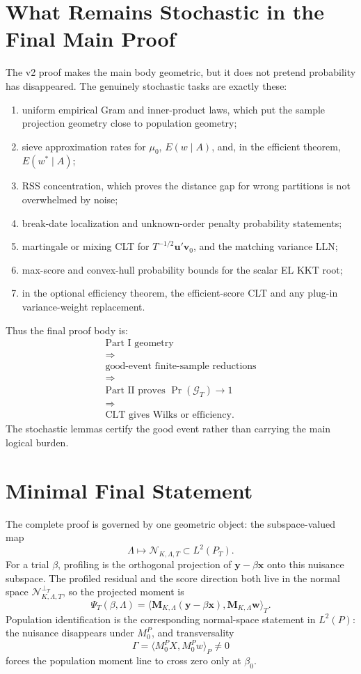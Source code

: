 \documentclass[12pt]{article}
\numberwithin{equation}{section}
\theoremstyle{definition}
\newcommand{\N}{\mathcal N}
\newcommand{\innerT}[2]{\langle #1,#2\rangle_T}
\newcommand{\innerP}[2]{\langle #1,#2\rangle_P}
\begin{document}
\section{What Remains Stochastic in the Final Main Proof}

The v2 proof makes the main body geometric, but it does not pretend probability
has disappeared. The genuinely stochastic tasks are exactly these:
\begin{enumerate}[leftmargin=2em]
\item uniform empirical Gram and inner-product laws, which put the sample
projection geometry close to population geometry;
\item sieve approximation rates for \(\mu_0\), \(E(w\mid A)\), and, in the
efficient theorem, \(E(w^*\mid A)\);
\item RSS concentration, which proves the distance gap for wrong partitions is
not overwhelmed by noise;
\item break-date localization and unknown-order penalty probability statements;
\item martingale or mixing CLT for \(T^{-1/2}\bm u'\bm v_0\), and the matching
variance LLN;
\item max-score and convex-hull probability bounds for the scalar EL KKT root;
\item in the optional efficiency theorem, the efficient-score CLT and any
plug-in variance-weight replacement.
\end{enumerate}

Thus the final proof body is:
\[
\begin{array}{c}
    \text{Part I geometry}\\
    \Longrightarrow\\
    \text{good-event finite-sample reductions}\\
    \Longrightarrow\\
    \text{Part II proves }\Pr(\mathcal G_T)\to1\\
    \Longrightarrow\\
    \text{CLT gives Wilks or efficiency.}
\end{array}
\]
The stochastic lemmas certify the good event rather than carrying the main logical burden.
\section{Minimal Final Statement}

The complete proof is governed by one geometric object: the subspace-valued map
\[
    \Lambda\longmapsto \N_{K,\Lambda,T}\subset L^2(P_T).
\]
For a trial \(\beta\), profiling is the orthogonal projection of
\(\bm y-\beta\bm x\) onto this nuisance subspace. The profiled residual and the
score direction both live in the normal space
\(\N_{K,\Lambda,T}^{\perp_T}\), so the projected moment is
\[
    \Psi_T(\beta,
    \Lambda)=\innerT{\bm M_{K,\Lambda}(\bm y-\beta\bm x)}
                    {\bm M_{K,\Lambda}\bm w}.
\]
Population identification is the corresponding normal-space statement in
\(L^2(P)\): the nuisance disappears under \(M_0^P\), and transversality
\[
    \Gamma=\innerP{M_0^PX}{M_0^Pw}\ne0
\]
forces the population moment line to cross zero only at \(\beta_0\).
\end{document}
